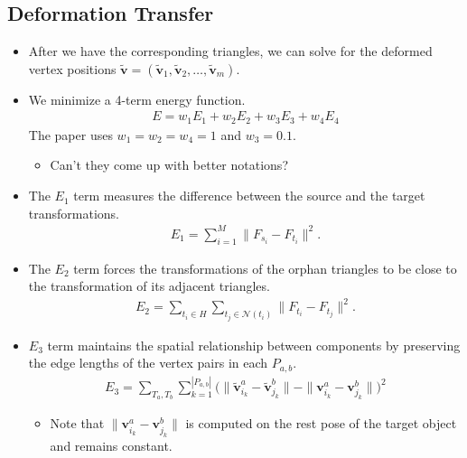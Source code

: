 \documentclass[10pt]{article}
\newcommand{\ve}[1]{\mathbf{#1}}
\newcommand{\mcal}[1]{\mathcal{#1}}
\begin{document}
\subsection{Deformation Transfer}

\begin{itemize}
    \item After we have the corresponding triangles, we can solve for the deformed vertex positions $\widetilde{\ve{v}} = ( \widetilde{\ve{v}}_1, \widetilde{\ve{v}}_2, \ldots, \widetilde{\ve{v}}_m)$.
    
    \item We minimize a 4-term energy function.
    \begin{align*}
        E = w_1 E_1 + w_2 E_2 + w_3 E_3 + w_4 E_4
    \end{align*}
    The paper uses $w_1 = w_2 = w_4 = 1$ and $w_3 = 0.1$.
    \begin{itemize}
        \item Can't they come up with better notations?
    \end{itemize}

    \item The $E_1$ term measures the difference between the source and the target transformations.
    \begin{align*}
        E_1 = \sum_{i=1}^{M} \| F_{s_i} - F_{t_i} \|^2.
    \end{align*}

    \item The $E_2$ term forces the transformations of the orphan triangles to be close to the transformation of its adjacent triangles.
    \begin{align*}
        E_2 = \sum_{t_i \in H} \sum_{t_j \in \mcal{N}(t_i)} \| F_{t_i} - F_{t_j} \|^2.
    \end{align*}

    \item $E_3$ term maintains the spatial relationship between components by preserving the edge lengths of the vertex pairs in each $P_{a,b}$.
    \begin{align*}
        E_3 =  \sum_{T_a, T_b} \sum_{k=1}^{|P_{a,b}|} \big( \| \widetilde{\ve{v}}_{i_k}^a - \widetilde{\ve{v}}_{j_k}^b \| - \| \ve{v}_{i_k}^a - \ve{v}_{j_k}^b \|  \big)^2
    \end{align*}
    \begin{itemize}
        \item Note that $\| \ve{v}_{i_k}^a - \ve{v}_{j_k}^b\|$ is computed on the rest pose of the target object and remains constant.
        

\end{itemize}
\end{itemize}
\end{document}
